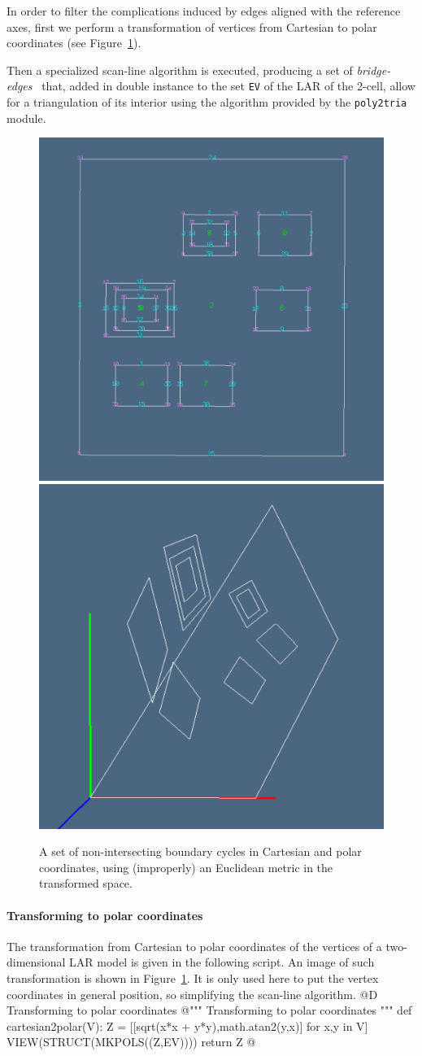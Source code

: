\documentclass[11pt,oneside]{article}    %
\begin{document}
In order to filter the complications induced by edges aligned with the reference axes, first we perform a transformation of vertices from Cartesian to polar coordinates (see Figure~\ref{fig:polarholes}).

Then a specialized scan-line algorithm is executed, producing a set of \emph{bridge-edges}~\cite{Yamaguchi:85} that, added in double instance to the set \texttt{EV} of the LAR of the 2-cell, allow for a triangulation of its interior using the algorithm provided by the \texttt{poly2tria} module.

\begin{figure}[htbp] %
   \centering
   \includegraphics[height=0.33\linewidth,width=0.33\linewidth]{images/lattice1} 
   \includegraphics[height=0.33\linewidth,width=0.33\linewidth]{images/polarholes} 
   \caption{A set of non-intersecting boundary cycles in Cartesian and polar coordinates, using (improperly) an Euclidean metric in the transformed space.}
   \label{fig:polarholes}
\end{figure}


\paragraph{Transforming to polar coordinates}

The transformation from Cartesian to polar coordinates of the vertices of a two-dimensional LAR model is given in the following script. An image of such transformation is shown in Figure~\ref{fig:polarholes}. It is only used here to put the vertex coordinates in general position, so simplifying the scan-line algorithm.
@D Transforming to polar coordinates 
@{""" Transforming to polar coordinates """
def cartesian2polar(V):    
    Z = [[sqrt(x*x + y*y),math.atan2(y,x)] for x,y in V]
    VIEW(STRUCT(MKPOLS((Z,EV))))
    return Z
@}
\end{document}
